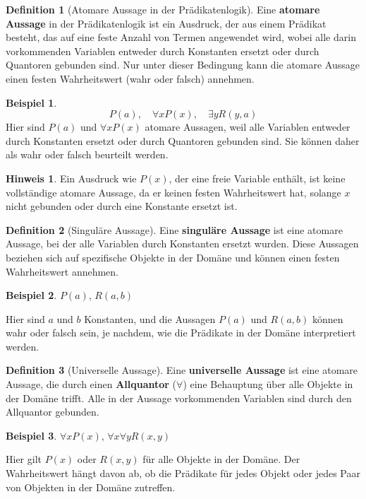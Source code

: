 \documentclass{book}
\theoremstyle{plain}
\theoremstyle{remark}
\theoremstyle{definition}
\newtheorem{definition}{Definition}[section]
\newtheorem*{example}{Beispiel}
\newtheorem*{hint}{Hinweis}
\begin{document}
\begin{definition}[Atomare Aussage in der Prädikatenlogik]
Eine \textbf{atomare Aussage} in der Prädikatenlogik ist ein Ausdruck, der aus einem Prädikat besteht, das auf eine feste Anzahl von Termen angewendet wird, wobei alle darin vorkommenden Variablen entweder durch Konstanten ersetzt oder durch Quantoren gebunden sind. Nur unter dieser Bedingung kann die atomare Aussage einen festen Wahrheitswert (wahr oder falsch) annehmen.

\begin{example}
\[
P(a), \quad \forall x P(x), \quad \exists y R(y, a)
\]
Hier sind \(P(a)\) und \(\forall x P(x)\) atomare Aussagen, weil alle Variablen entweder durch Konstanten ersetzt oder durch Quantoren gebunden sind. Sie können daher als wahr oder falsch beurteilt werden.
\end{example}

\begin{hint}
Ein Ausdruck wie \(P(x)\), der eine freie Variable enthält, ist keine vollständige atomare Aussage, da er keinen festen Wahrheitswert hat, solange \(x\) nicht gebunden oder durch eine Konstante ersetzt ist.
\end{hint}
\end{definition}

\begin{definition}[Singuläre Aussage]
Eine \textbf{singuläre Aussage} ist eine atomare Aussage, bei der alle Variablen durch Konstanten ersetzt wurden. Diese Aussagen beziehen sich auf spezifische Objekte in der Domäne und können einen festen Wahrheitswert annehmen.

\begin{example}
    \(P(a)\), \quad \(R(a, b)\)
\end{example}

Hier sind \(a\) und \(b\) Konstanten, und die Aussagen \(P(a)\) und \(R(a, b)\) können wahr oder falsch sein, je nachdem, wie die Prädikate in der Domäne interpretiert werden.
\end{definition}

\begin{definition}[Universelle Aussage]
Eine \textbf{universelle Aussage} ist eine atomare Aussage, die durch einen \textbf{Allquantor} (\(\forall\)) eine Behauptung über alle Objekte in der Domäne trifft. Alle in der Aussage vorkommenden Variablen sind durch den Allquantor gebunden.

\begin{example}
    \(\forall x P(x)\), \quad \(\forall x \forall y R(x, y)\)
\end{example}

Hier gilt \(P(x)\) oder \(R(x, y)\) für alle Objekte in der Domäne. Der Wahrheitswert hängt davon ab, ob die Prädikate für jedes Objekt oder jedes Paar von Objekten in der Domäne zutreffen.
\end{definition}
\end{document}
